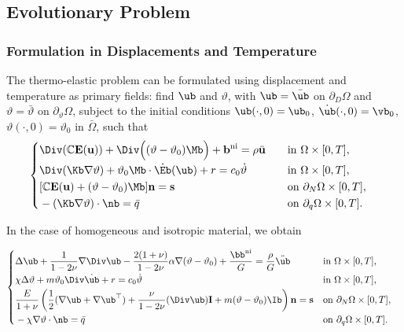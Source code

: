 \subsection{Evolutionary Problem}
\subsubsection{Formulation in Displacements and Temperature}
The thermo-elastic problem can be formulated using displacement and temperature as primary fields: find $\ub$ and $\vartheta$, with $\ub = \bar{\ub}$ on 
$\partial_D\Omega$ and $\vartheta = \bar{\vartheta}$ on $\partial_\vartheta\Omega$, subject to the initial conditions $\ub(\cdot, 0) = \ub_0$, $\dot{\ub}(\cdot, 0) = \vb_0$, $\vartheta(\cdot, 0) = \vartheta_0$ in $\bar\Omega$, such that
\begin{equation}
	\begin{cases}
		\begin{aligned}
			&\Div(\mathbb{C}\mathbf{E}(\mathbf{u})) + \Div \Big( (\vartheta - \vartheta_0)\Mb \Big) + \mathbf{b}^{\rm ni} = \rho\ddot{\mathbf{u}} 
			\quad &&\mathrm{in~}\Omega \times [0,T],\\
			&\Div (\Kb \nabla \vartheta) + \vartheta_0\Mb \cdot \dot{\Eb}(\ub) + r = c_0\dot{\vartheta} &&\mathrm{in~}\Omega \times [0,T],\\
			&[\mathbb{C}\mathbf{E}(\mathbf{u}) + (\vartheta - \vartheta_0)\Mb]\mathbf{n} = \mathbf{s} &&\mathrm{on~}\partial_N\Omega \times [0,T],\\
			&-(\Kb \nabla \vartheta)\cdot \nb = \bar{q}&&\mathrm{on~}\partial_q\Omega \times [0,T].\\
		\end{aligned}
	\end{cases}
\end{equation}

In the case of homogeneous and isotropic material, we obtain

\begin{definition}
	\begin{equation}
		\begin{cases}
			\begin{aligned}
				&\Delta \ub + \frac{1}{1-2\nu} \nabla \Div \ub - \frac{2(1+\nu)}{1-2\nu} \alpha \nabla (\vartheta - \vartheta_0) + \frac{\bb^{\rm ni}}{G} = \frac{\rho}{G} \ddot{\ub}  \quad &&\mathrm{in~}\Omega \times [0,T],\\
				&	\chi \Delta \vartheta + m \vartheta_0 \Div \dot{\ub} + r = c_0 \dot{\vartheta} &&\mathrm{in~}\Omega \times [0,T],\\
				&\frac{E}{1+\nu} \left( \frac12 (\nabla \ub + \nabla \ub^\top) + \frac{\nu}{1-2\nu} (\Div \ub) \mathbf{I} + m (\vartheta - \vartheta_0) \Ib \right) \mathbf{n} = \mathbf{s} &&\mathrm{on~}\partial_N\Omega \times [0,T],\\
				&-\chi \nabla \vartheta \cdot \nb = \bar{q}&&\mathrm{on~}\partial_q\Omega \times [0,T].
			\end{aligned}
		\end{cases}
	\end{equation}
\end{definition}


